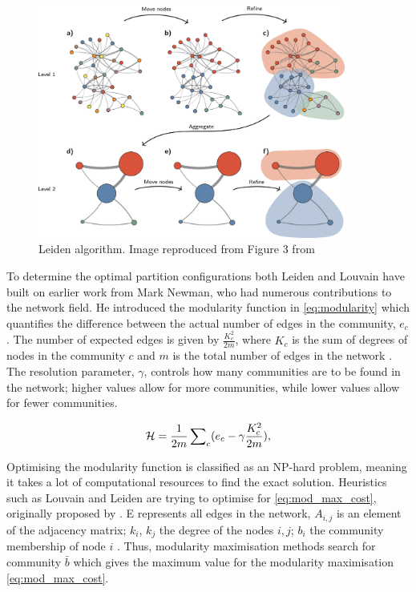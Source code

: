 \begin{figure}[!htb]    
    \centering
\includegraphics[width=0.9\textwidth,height=0.9\textheight,keepaspectratio]{Sections/Lit_review/Resources/Leiden_algorithm.png}
    \caption[Leiden algorithm]{Leiden algorithm. Image reproduced from Figure 3 from \citet{Traag2019-ne}}
    \label{fig:N_I:leiden-explained}
\end{figure}



To determine the optimal partition configurations both Leiden and Louvain have built on earlier work from Mark Newman, who had numerous contributions to the network field. He introduced the modularity function in \cref{eq:modularity} which quantifies the difference between the actual number of edges in the community, $e_c$ \citep{Newman2004-dd}. The number of expected edges is given by $\frac{K_c^2}{2m}$, where $K_c$ is the sum of degrees of nodes in the community $c$ and $m$ is the total number of edges in the network \citep{Traag2019-ne}. The resolution parameter, $\gamma$, controls how many communities are to be found in the network; higher values allow for more communities, while lower values allow for fewer communities.


\begin{equation} \label{eq:modularity}
    {\mathcal H} =\frac{1}{2m}\,{\sum }_{c}({e}_{c}-{\rm{\gamma }}\frac{{K}_{c}^{2}}{2m}),
\end{equation}

Optimising the modularity function is classified as an NP-hard problem, meaning it takes a lot of computational resources to find the exact solution. Heuristics such as Louvain and Leiden are trying to optimise for \cref{eq:mod_max_cost}, originally proposed by \cite{Newman2006-dn}. E represents all edges in the network, $A_{i,j}$ is an element of the adjacency matrix; $k_i$, $k_j$ the degree of the nodes $i,j$; $b_i$ the community membership of node $i$ \citep{Peixoto2023-se}. Thus, modularity maximisation methods search for community $\bar{b}$ which gives the maximum value for the modularity maximisation \cref{eq:mod_max_cost}.

